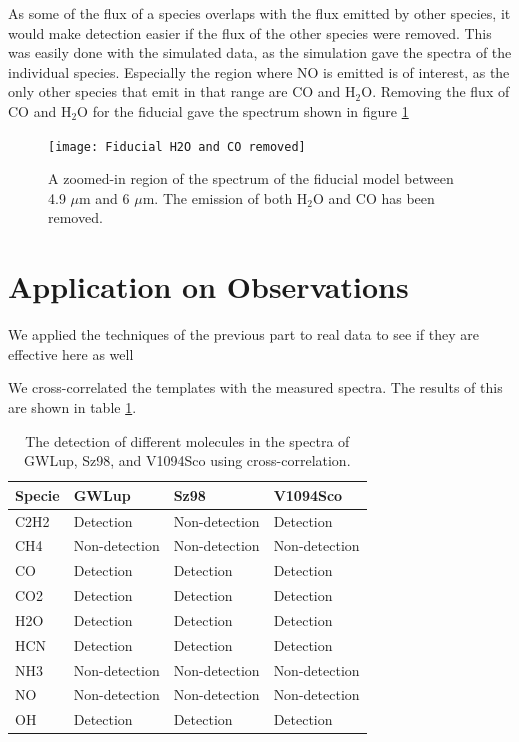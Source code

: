 \documentclass[twoside, single, authoryear, semicolon]{lion-msc}
\newcommand{\4}{$_4$}
\newcommand{\3}{$_3$}
\newcommand{\2}{$_2$}
\begin{document}


As some of the flux of a species overlaps with the flux emitted by other species, it would make detection easier if the flux of the other species were removed. This was easily done with the simulated data, as the simulation gave the spectra of the individual species. Especially the region where NO is emitted is of interest, as the only other species that emit in that range are CO and H\2O. Removing the flux of CO and H\2O for the fiducial gave the spectrum shown in figure \ref{fig: H2O and CO removed}

\begin{figure}
    \centering
    \texttt{[image: Fiducial H2O and CO removed]}
    \caption{A zoomed-in region of the spectrum of the fiducial model between 4.9 $\mu$m and 6 $\mu$m. The emission of both H\2O and CO has been removed.}
    \label{fig: H2O and CO removed}
\end{figure}

\section{Application on Observations}
We applied the techniques of the previous part to real data to see if they are effective here as well

We cross-correlated the templates with the measured spectra. The results of this are shown in table \ref{tab: realdata}.

\begin{table}[!ht]
\centering
\begin{tabular}{llll}
\hline
\textbf{Specie} & \textbf{GWLup} & \textbf{Sz98} & \textbf{V1094Sco} \\ \hline
C2H2            & Detection      & Non-detection & Detection         \\
CH4             & Non-detection  & Non-detection & Non-detection     \\
CO              & Detection      & Detection     & Detection         \\
CO2             & Detection      & Detection     & Detection         \\
H2O             & Detection      & Detection     & Detection         \\
HCN             & Detection      & Detection     & Detection         \\
NH3             & Non-detection  & Non-detection & Non-detection     \\
NO              & Non-detection  & Non-detection & Non-detection     \\
OH              & Detection      & Detection     & Detection         \\ \hline
\end{tabular}
\caption{The detection of different molecules in the spectra of GWLup, Sz98, and V1094Sco using cross-correlation.}
\label{tab: realdata}
\end{table}
\end{document}
